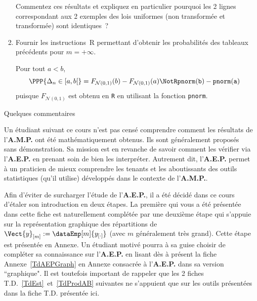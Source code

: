\documentclass[10pt]{report}
\begin{document}
\begin{exercice}
\begin{enumerate}
Commentez ces résultats et expliquez en particulier pourquoi les 2 lignes correspondant aux 2 exemples des lois uniformes (non transformée et transformée) sont identiques~?
\item Fournir les instructions~R permettant d'obtenir les probabilités des tableaux précédents pour $m=+\infty$.\\
\begin{Correction} Pour tout $a<b$,
$$\PPP{\Delta_n \in [a,b[}=F_{\mathcal{N}(0,1)}(b)-F_{\mathcal{N}(0,1)}(a)\NotR\mathtt{pnorm(b)-pnorm(a)}$$
puisque $F_{\mathcal{N}(0,1)}$ est obtenu en \texttt{R} en utilisant la fonction \texttt{pnorm}.
\end{Correction}
\end{enumerate}
\end{exercice}

\begin{IndicList}{Quelques commentaires} 
\item Un étudiant suivant ce cours n'est pas censé comprendre comment les résultats de l'\textbf{A.M.P.} ont été mathématiquement obtenus. Ils sont généralement proposés sans démonstration.
Sa mission est en revanche de savoir comment les vérifier via l'\textbf{A.E.P.} en prenant soin de bien les interpréter. Autrement dit, l'\textbf{A.E.P.} permet à un praticien de mieux comprendre les tenants et les aboutissants des outils statistiques (qu'il utilise) développés dans le contexte de l'\textbf{A.M.P.}.
\item Afin d'éviter de surcharger l'étude de l'\textbf{A.E.P.}, il a été décidé dans ce cours d'étaler son introduction en deux étapes. La première qui vous a été présentée dans cette fiche est naturellement complétée par une deuxième étape qui s'appuie sur la représentation graphique des répartitions de $\Vect{y}_{[m]}:=\dataEmp[m]{y_{[\cdot]}}$ (avec $m$ généralement très grand).
Cette étape est présentée en Annexe. Un étudiant motivé pourra à sa guise choisir de compléter sa connaissance sur l'\textbf{A.E.P.} en lisant dès à présent la fiche Annexe~\ref{TdAEPGraph} en Annexe consacrée à l'\textbf{A.E.P.} dans sa version ``graphique". Il est toutefois important de rappeler que les 2 fiches T.D.~\ref{TdEst}~et~\ref{TdProdAB} suivantes ne s'appuient que sur les outils présentées dans la fiche T.D. présentée ici.      

\end{IndicList}
\end{document}
